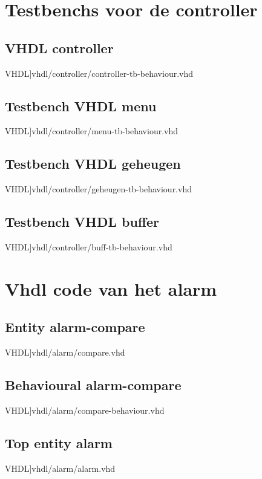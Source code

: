 \section{Testbenchs voor de controller}
\subsection{VHDL controller}
\scriptsize 
  VHDL]{vhdl/controller/controller-tb-behaviour.vhd}
 \normalsize
\label{code:tb_controller}
\subsection{Testbench VHDL menu}
\scriptsize 
  VHDL]{vhdl/controller/menu-tb-behaviour.vhd}
 \normalsize
\label{code:tb_menu}
\subsection{Testbench VHDL geheugen}
\scriptsize 
  VHDL]{vhdl/controller/geheugen-tb-behaviour.vhd}
 \normalsize
\label{code:tb_geheugen}
\subsection{Testbench VHDL buffer}
\scriptsize 
  VHDL]{vhdl/controller/buff-tb-behaviour.vhd}
 \normalsize
\label{code:tb_buffer}
\section{Vhdl code van het alarm}
\label{Ap:code_alarm}
\subsection{Entity alarm-compare}
\scriptsize 
  VHDL]{vhdl/alarm/compare.vhd}
 \normalsize
\label{code:ent_alarm_compare}
\subsection{Behavioural alarm-compare}
\scriptsize 
  VHDL]{vhdl/alarm/compare-behaviour.vhd}
 \normalsize
\label{code:beh_alarm_compare}
\subsection{Top entity alarm}
\scriptsize 
  VHDL]{vhdl/alarm/alarm.vhd}
 \normalsize
\label{code:ent_alarm}
